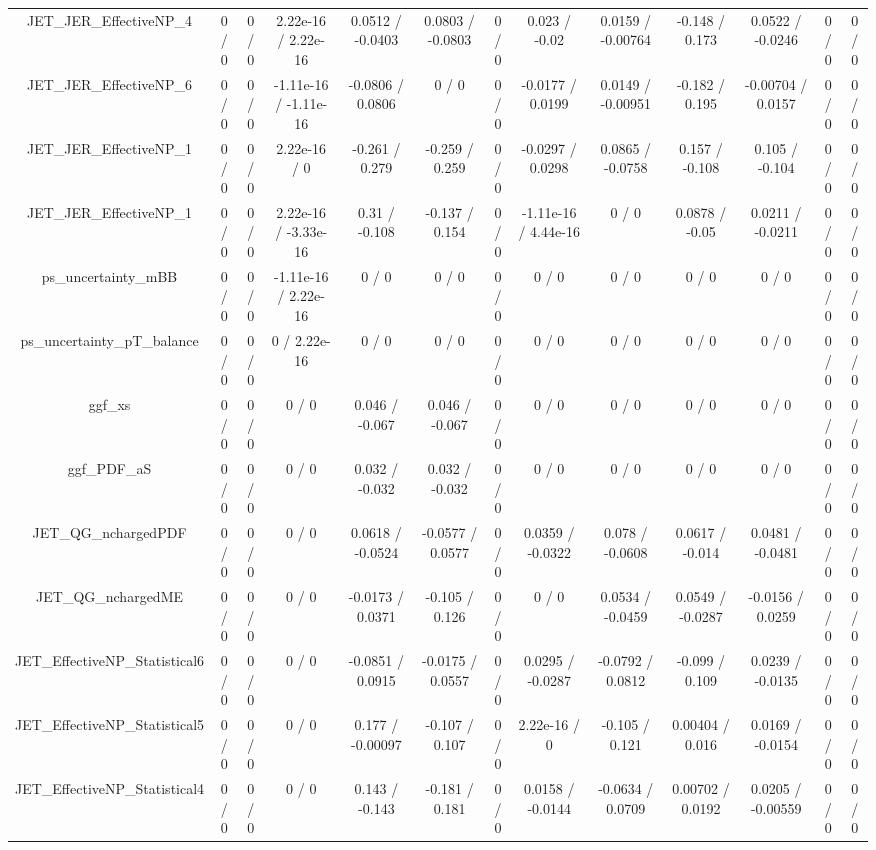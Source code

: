 \documentclass[10pt]{article}
\begin{document}
\begin{table}[htbp]
\begin{center}
\begin{tabular}{|c|c|c|c|c|c|c|c|c|c|c|c|c|}
  JET_JER_EffectiveNP_4 & 0 / 0 & 0 / 0 & 2.22e-16 / 2.22e-16 & 0.0512 / -0.0403 & 0.0803 / -0.0803 & 0 / 0 & 0.023 / -0.02 & 0.0159 / -0.00764 & -0.148 / 0.173 & 0.0522 / -0.0246 & 0 / 0 & 0 / 0 \\ 
  JET_JER_EffectiveNP_6 & 0 / 0 & 0 / 0 & -1.11e-16 / -1.11e-16 & -0.0806 / 0.0806 & 0 / 0 & 0 / 0 & -0.0177 / 0.0199 & 0.0149 / -0.00951 & -0.182 / 0.195 & -0.00704 / 0.0157 & 0 / 0 & 0 / 0 \\ 
  JET_JER_EffectiveNP_1 & 0 / 0 & 0 / 0 & 2.22e-16 / 0 & -0.261 / 0.279 & -0.259 / 0.259 & 0 / 0 & -0.0297 / 0.0298 & 0.0865 / -0.0758 & 0.157 / -0.108 & 0.105 / -0.104 & 0 / 0 & 0 / 0 \\ 
  JET_JER_EffectiveNP_1 & 0 / 0 & 0 / 0 & 2.22e-16 / -3.33e-16 & 0.31 / -0.108 & -0.137 / 0.154 & 0 / 0 & -1.11e-16 / 4.44e-16 & 0 / 0 & 0.0878 / -0.05 & 0.0211 / -0.0211 & 0 / 0 & 0 / 0 \\ 
  ps_uncertainty_mBB & 0 / 0 & 0 / 0 & -1.11e-16 / 2.22e-16 & 0 / 0 & 0 / 0 & 0 / 0 & 0 / 0 & 0 / 0 & 0 / 0 & 0 / 0 & 0 / 0 & 0 / 0 \\ 
  ps_uncertainty_pT_balance & 0 / 0 & 0 / 0 & 0 / 2.22e-16 & 0 / 0 & 0 / 0 & 0 / 0 & 0 / 0 & 0 / 0 & 0 / 0 & 0 / 0 & 0 / 0 & 0 / 0 \\ 
  ggf_xs & 0 / 0 & 0 / 0 & 0 / 0 & 0.046 / -0.067 & 0.046 / -0.067 & 0 / 0 & 0 / 0 & 0 / 0 & 0 / 0 & 0 / 0 & 0 / 0 & 0 / 0 \\ 
  ggf_PDF_aS & 0 / 0 & 0 / 0 & 0 / 0 & 0.032 / -0.032 & 0.032 / -0.032 & 0 / 0 & 0 / 0 & 0 / 0 & 0 / 0 & 0 / 0 & 0 / 0 & 0 / 0 \\ 
  JET_QG_nchargedPDF & 0 / 0 & 0 / 0 & 0 / 0 & 0.0618 / -0.0524 & -0.0577 / 0.0577 & 0 / 0 & 0.0359 / -0.0322 & 0.078 / -0.0608 & 0.0617 / -0.014 & 0.0481 / -0.0481 & 0 / 0 & 0 / 0 \\ 
  JET_QG_nchargedME & 0 / 0 & 0 / 0 & 0 / 0 & -0.0173 / 0.0371 & -0.105 / 0.126 & 0 / 0 & 0 / 0 & 0.0534 / -0.0459 & 0.0549 / -0.0287 & -0.0156 / 0.0259 & 0 / 0 & 0 / 0 \\ 
  JET_EffectiveNP_Statistical6 & 0 / 0 & 0 / 0 & 0 / 0 & -0.0851 / 0.0915 & -0.0175 / 0.0557 & 0 / 0 & 0.0295 / -0.0287 & -0.0792 / 0.0812 & -0.099 / 0.109 & 0.0239 / -0.0135 & 0 / 0 & 0 / 0 \\ 
  JET_EffectiveNP_Statistical5 & 0 / 0 & 0 / 0 & 0 / 0 & 0.177 / -0.00097 & -0.107 / 0.107 & 0 / 0 & 2.22e-16 / 0 & -0.105 / 0.121 & 0.00404 / 0.016 & 0.0169 / -0.0154 & 0 / 0 & 0 / 0 \\ 
  JET_EffectiveNP_Statistical4 & 0 / 0 & 0 / 0 & 0 / 0 & 0.143 / -0.143 & -0.181 / 0.181 & 0 / 0 & 0.0158 / -0.0144 & -0.0634 / 0.0709 & 0.00702 / 0.0192 & 0.0205 / -0.00559 & 0 / 0 & 0 / 0 \\ 

\end{tabular}
\end{center}
\end{table}
\end{document}
